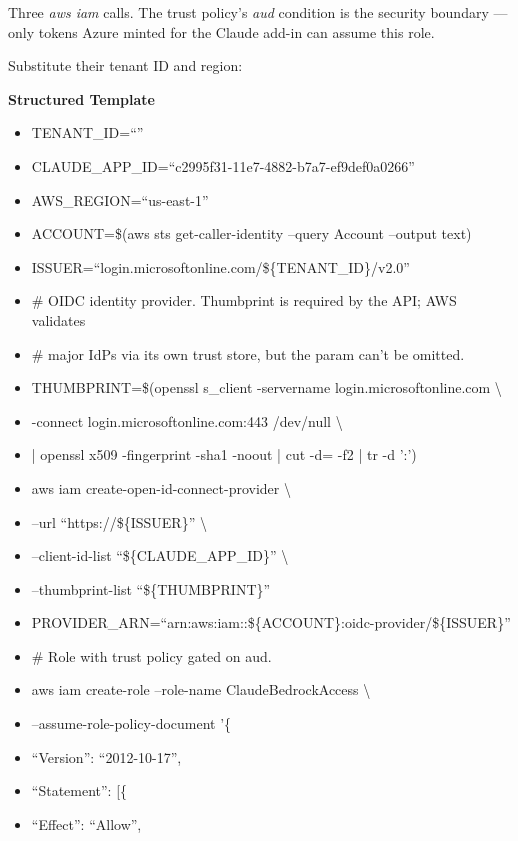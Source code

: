 \documentclass[11pt]{article}
\begin{document}
Three \emph{aws iam} calls. The trust policy's \emph{aud} condition is the security boundary — only tokens Azure minted for the Claude add-in can assume this role.


Substitute their tenant ID and region:


\textbf{Structured Template}
\begin{itemize}[leftmargin=*,itemsep=2pt,topsep=2pt]
\item {} TENANT\_\allowbreak{}ID=``''
\item {} CLAUDE\_\allowbreak{}APP\_\allowbreak{}ID=``c2995f31-11e7-4882-b7a7-ef9def0a0266''
\item {} AWS\_\allowbreak{}REGION=``us-east-1''
\item {} ACCOUNT=\$(aws sts get-caller-identity --query Account --output text)
\item {} ISSUER=``login.microsoftonline.com/\$\{TENANT\_\allowbreak{}ID\}/v2.0''
\item {} \# OIDC identity provider. Thumbprint is required by the API; AWS validates
\item {} \# major IdPs via its own trust store, but the param can't be omitted.
\item {} THUMBPRINT=\$(openssl s\_\allowbreak{}client -servername login.microsoftonline.com \textbackslash{}
\item {} -connect login.microsoftonline.com:443 /dev/null \textbackslash{}
\item {} | openssl x509 -fingerprint -sha1 -noout | cut -d= -f2 | tr -d ':')
\item {} aws iam create-open-id-connect-provider \textbackslash{}
\item {} --url ``https://\$\{ISSUER\}'' \textbackslash{}
\item {} --client-id-list ``\$\{CLAUDE\_\allowbreak{}APP\_\allowbreak{}ID\}'' \textbackslash{}
\item {} --thumbprint-list ``\$\{THUMBPRINT\}''
\item {} PROVIDER\_\allowbreak{}ARN=``arn:aws:iam::\$\{ACCOUNT\}:oidc-provider/\$\{ISSUER\}''
\item {} \# Role with trust policy gated on aud.
\item {} aws iam create-role --role-name ClaudeBedrockAccess \textbackslash{}
\item {} --assume-role-policy-document '\{
\item {} ``Version'': ``2012-10-17'',
\item {} ``Statement'': [\{
\item {} ``Effect'': ``Allow'',

\end{itemize}
\end{document}
